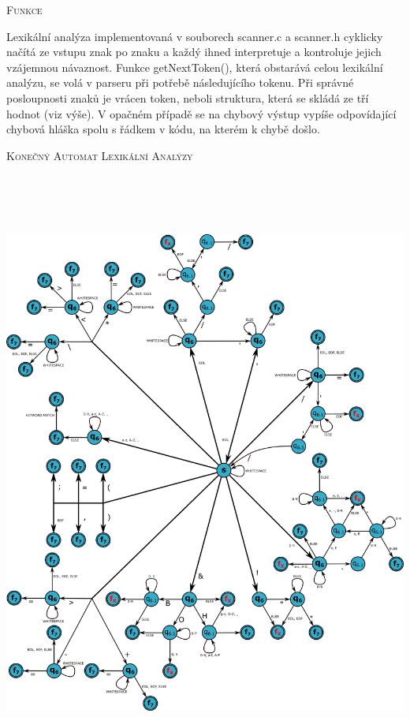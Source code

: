 \documentclass[12pt,a4paper]{report}
\begin{document}
{\scshape\Large Funkce\par}
\vspace{0.3cm}
Lexikální analýza implementovaná v souborech scanner.c a scanner.h cyklicky načítá ze vstupu znak po znaku a každý ihned interpretuje a kontroluje jejich vzájemnou návaznost. Funkce getNextToken(), která obstarává celou lexikální analýzu, se volá v parseru při potřebě následujícího tokenu. Při správné posloupnosti znaků je vrácen token, neboli struktura, která se skládá ze tří hodnot (viz výše). V opačném případě se na chybový výstup vypíše odpovídající chybová hláška spolu s řádkem v kódu, na kterém k chybě došlo. 
\newpage

{\scshape\Large Konečný Automat Lexikální Analýzy\par}
\vspace{0.2cm}
\centerline{\includegraphics[height=20cm]{KA}}
{\newpage}
\end{document}
